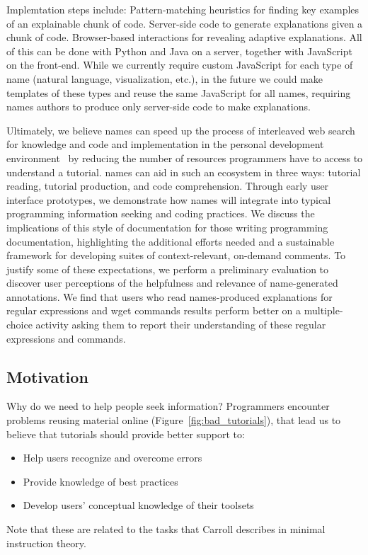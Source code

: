 Implemtation steps include:
Pattern-matching heuristics for finding key examples of an explainable chunk of code.
Server-side code to generate explanations given a chunk of code.
Browser-based interactions for revealing adaptive explanations.
All of this can be done with Python and Java on a server, together with JavaScript on the front-end.
While we currently require custom JavaScript for each type of \gls{name} (natural language, visualization, etc.), in the future we could make templates of these types and reuse the same JavaScript for all \glspl{name}, requiring \glspl{name} authors to produce only server-side code to make explanations.

Ultimately, we believe \glspl{name} can speed up the process of interleaved web search for knowledge and code and implementation in the personal development environment~\cite{brandt} by reducing the number of resources programmers have to access to understand a tutorial.
\Glspl{name} can aid in such an ecosystem in three ways: tutorial reading, tutorial production, and code comprehension.
Through early user interface prototypes, we demonstrate how \glspl{name} will integrate into typical programming information seeking and coding practices.
We discuss the implications of this style of documentation for those writing programming documentation, highlighting the additional efforts needed and a sustainable framework for developing suites of context-relevant, on-demand comments.
To justify some of these expectations, we perform a preliminary evaluation to discover user perceptions of the helpfulness and relevance of \gls{name}-generated annotations.
We find that users who read \glspl{name}-produced explanations for regular expressions and wget commands results perform better on a multiple-choice activity asking them to report their understanding of these regular expressions and commands.

\subsection{Motivation}

Why do we need to help people seek information?
Programmers encounter problems reusing material online (Figure~\ref{fig:bad_tutorials}), that lead us to believe that tutorials should provide better support to:
\begin{itemize} \itemsep1pt
\item Help users recognize and overcome errors
\item Provide knowledge of best practices
\item Develop users' conceptual knowledge of their toolsets
\end{itemize}
Note that these are related to the tasks that Carroll describes in minimal instruction theory.

